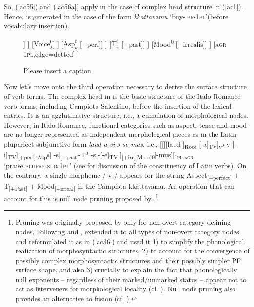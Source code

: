 \documentclass[output=paper]{langscibook}
\begin{document}
So, (\ref{ac55}) and (\ref{ac56a}) apply in the case of complex head structure in (\ref{ac1}).  Hence,  is generated in the case of the form \textit{kkattavamu} ‘buy-\textsc{ipf}-\textsc{1pl}’(before vocabulary insertion).

\begin{figure}
\caption{\label{ac57}\color{red}Please insert a caption}
	\begin{forest}
		[Mood\textsuperscript{P}
			[Mood$^0$
				[$\text{T}^0_h$
					[$\text{Asp}^0_k$
						[$\text{Voice}^0_j$
							[v\textsuperscript{0}
								[$\surd{}\text{Root}^0_i$ \textsc{buy}]
								[v\textsuperscript{0}
									[v\textsuperscript{0}]
									[TV]
								]
							]
							[$\text{Voice}^0_j$]
						]
						[$\text{Asp}^0_k$ {[−perf]}]
					]
					[$\text{T}^0_h$ {[+past]}]
				]
				[Mood\textsuperscript{0} {[−irrealis]}]
			]
			[\textsc{agr 1pl},edge=dotted]
		]		
	\end{forest}
\end{figure}

Now let's move onto the third operation necessary to derive the surface structure of verb forms. The complex head in   is the basic structure of the Italo-Romance verb forms, including Campiota Salentino, before the insertion of the lexical entries. It is an agglutinative structure, i.e., a cumulation of morphological nodes. However, in Italo-Romance, functional categories such as aspect, tense and mood are no longer represented as independent morphological pieces as in the Latin pluperfect subjunctive form \textit{laud-a-vi-s-se-mus}, i.e., [[[[laud-]\textsubscript{Root} [-a]\textsubscript{TV}]\textsubscript{v$^0$}-v-[-i]\textsubscript{TV}]\textsubscript{[+perf]-Asp$^0$}] -s]\textsubscript{[+past]}-T$^0$  -s -[-e]\textsubscript{TV} ]\textsubscript{[+irr]-Mood0}]-mus][\textsubscript{\textsc{1pl-agr}}  ‘praise.\textsc{pluprf}.\textsc{subj}\textsc{1pl}’ (see \citealt{calabrese2020} for discussion of the constituency of Latin verbs). On the contrary, a single morpheme /-v-/ appears for the string Aspect\textsubscript{[−perfect]} + T\textsubscript{[+Past]} + Mood\textsubscript{[−irreal]} in the Campiota kkattavamu.  An operation that can account for this is null node pruning proposed by \cite{calabrese2019a}.\footnote{Pruning was originally proposed by \cite{embick2010a} only for non-overt category defining nodes. Following \cite{christopoulos2017a} and \cite{christopoulos2018a}, \cite{calabrese2019a} extended it to all types of non-overt category nodes and reformulated it as in (\ref{ac36}) and used it 1) to simplify the phonological realization of morphosyntactic structures, 2) to account for the convergence of possibly complex morphosyntactic structures and their possibly simpler PF surface shape, and also 3) crucially to explain the fact that phonologically null exponents -- regardless of their marked/unmarked status --  appear not to act as interveners for morphological locality (cf. \citealt{embick2010a, calabrese2019a}). Null node pruning also provides an alternative to fusion (cf. \cite{halle1993a}).}
 
\end{document}
